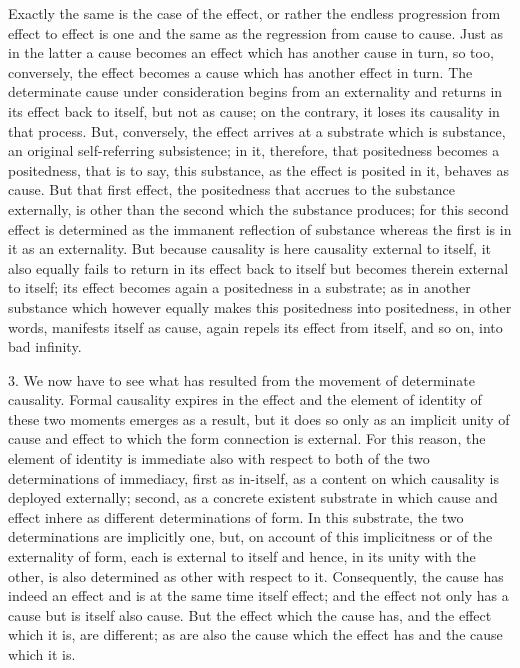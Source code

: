 Exactly the same is the case of the effect,
or rather the endless progression from effect to effect
is one and the same as  the regression from cause to cause.
Just as in the latter a cause becomes an effect
which has another cause in turn,
so too, conversely, the effect becomes a cause
which has another effect in turn.
The determinate cause under consideration
begins from an externality
and returns in its effect back to itself,
but not as cause;
on the contrary, it loses its causality in that process.
But, conversely, the effect arrives at
a substrate which is substance,
an original self-referring subsistence;
in it, therefore, that positedness becomes a positedness,
that is to say, this substance, as the effect is posited in it,
behaves as cause.
But that first effect, the positedness
that accrues to the substance externally,
is other than the second which the substance produces;
for this second effect is determined as
the immanent reflection of substance
whereas the first is in it as an externality.
But because causality is here causality external to itself,
it also equally fails to return in its effect back to itself
but becomes therein external to itself;
its effect becomes again a positedness in a substrate;
as in another substance which however
equally makes this positedness into positedness,
in other words, manifests itself as cause,
again repels its effect from itself,
and so on, into bad infinity.

3. We now have to see what has resulted from
the movement of determinate causality.
Formal causality expires in the effect
and the element of identity of
these two moments emerges as a result,
but it does so only as an implicit unity of
cause and effect to which the form connection is external.
For this reason, the element of identity is immediate also
with respect to both of the two determinations of immediacy,
first as in-itself,
as a content on which causality is deployed externally;
second, as a concrete existent substrate
in which cause and effect inhere
as different determinations of form.
In this substrate, the two determinations are implicitly one,
but, on account of this implicitness
or of the externality of form,
each is external to itself
and hence, in its unity with the other,
is also determined as other with respect to it.
Consequently, the cause has indeed an effect
and is at the same time itself effect;
and the effect not only has a cause
but is itself also cause.
But the effect which the cause has,
and the effect which it is,
are different;
as are also the cause which the effect has
and the cause which it is.

